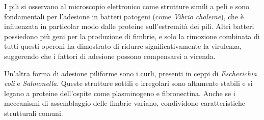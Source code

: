 \documentclass[../main.tex]{subfiles}
\begin{document}
I pili si osservano al microscopio elettronico come strutture simili a peli e sono fondamentali per l'adesione in batteri patogeni (come \textit{Vibrio cholerae}), che è influenzata in particolar modo dalle proteine sull'estremità dei pili.\cite{fallman_2005} Altri batteri possiedono più geni per la produzione di fimbrie, e solo la rimozione combinata di tutti questi operoni ha dimostrato di ridurre significativamente la virulenza, suggerendo che i fattori di adesione possono compensarsi a vicenda.

Un'altra forma di adesione piliforme sono i curli, presenti in ceppi di \textit{Escherichia coli} e \textit{Salmonella}.\cite{kenny_1997} Queste strutture sottili e irregolari sono altamente stabili e si legano a proteine dell'ospite come plasminogeno e fibronectina. Anche se i meccanismi di assemblaggio delle fimbrie variano, condividono caratteristiche strutturali comuni.\cite{soto_1999}\smallskip
\end{document}
